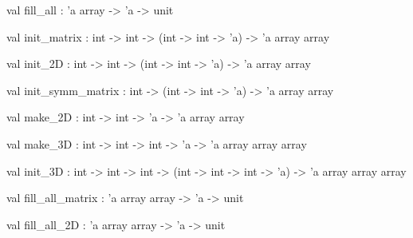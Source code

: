 \documentclass[11pt]{article}
\begin{document}
\begin{ocamldocsigend}
\label{val:Util.A.fill-underscoreall}\begin{ocamldoccode}
val fill_all : 'a array -> 'a -> unit
\end{ocamldoccode}


\label{val:Util.A.init-underscorematrix}\begin{ocamldoccode}
val init_matrix : int -> int -> (int -> int -> 'a) -> 'a array array
\end{ocamldoccode}


\label{val:Util.A.init-underscore2D}\begin{ocamldoccode}
val init_2D : int -> int -> (int -> int -> 'a) -> 'a array array
\end{ocamldoccode}


\label{val:Util.A.init-underscoresymm-underscorematrix}\begin{ocamldoccode}
val init_symm_matrix : int -> (int -> int -> 'a) -> 'a array array
\end{ocamldoccode}


\label{val:Util.A.make-underscore2D}\begin{ocamldoccode}
val make_2D : int -> int -> 'a -> 'a array array
\end{ocamldoccode}


\label{val:Util.A.make-underscore3D}\begin{ocamldoccode}
val make_3D : int -> int -> int -> 'a -> 'a array array array
\end{ocamldoccode}


\label{val:Util.A.init-underscore3D}\begin{ocamldoccode}
val init_3D :
  int -> int -> int -> (int -> int -> int -> 'a) -> 'a array array array
\end{ocamldoccode}


\label{val:Util.A.fill-underscoreall-underscorematrix}\begin{ocamldoccode}
val fill_all_matrix : 'a array array -> 'a -> unit
\end{ocamldoccode}


\label{val:Util.A.fill-underscoreall-underscore2D}\begin{ocamldoccode}
val fill_all_2D : 'a array array -> 'a -> unit
\end{ocamldoccode}



\end{ocamldocsigend}
\end{document}

